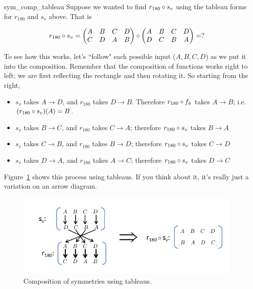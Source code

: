 \begin{example}{sym_comp_tableau}
Suppose we wanted to find  $r_{180} \circ s_v$ using the tableau forms for $r_{180}$ and $s_v$ above.  That is

\[ r_{180} \circ s_v = \begin{pmatrix} A & B & C & D \\ C & D & A & B \end{pmatrix} \circ  \begin{pmatrix} A & B & C & D \\ D & C & B & A \end{pmatrix} = ? \]

\noindent
To see how this works, let's ``follow" each possible input ($A, B, C, D$) as we put it into the composition.   Remember that the composition of functions works right to left; we are first reflecting the rectangle and then rotating it.  So starting from the right, 
\begin{itemize}
\item
$ s_v$ takes $A \to D$, and $r_{180}$ takes $D \to B$.  Therefore $r_{180} \circ f_h$ takes $A \to B$; i.e. $(r_{180} \circ s_v)(A) = B$.
\item
$ s_v$ takes $B \to C$, and $r_{180}$ takes $C \to A$; therefore $r_{180} \circ s_v$ takes $B \to A$
\item
$ s_v$ takes $C \to B$, and $r_{180}$ takes $B \to D$; therefore $r_{180} \circ s_v$ takes $C \to D$
\item
$ s_v$ takes $D \to A$, and $r_{180}$ takes $A \to C$; therefore $r_{180} \circ s_v$ takes $D \to C$
\end{itemize}
\noindent
Figure~\ref{fig:ChangingRoom} shows this process using tableaus.  If you think about it, it's really just a variation on an arrow diagram.
\begin{figure}[ht]
\begin{center}
\includegraphics[scale=0.6]{images/ChangingRoom.png}
\caption{Composition of symmetries using tableaus.}\label{fig:ChangingRoom}
\end{center}
\end{figure}
\noindent


\end{example}
